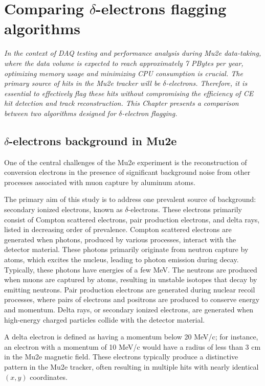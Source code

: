 \chapter{Comparing $\delta$-electrons flagging algorithms}\label{delta}
\textit{In the context of DAQ testing and performance analysis during Mu2e data-taking, 
where the data volume is expected to reach approximately 7 PBytes per year, optimizing 
memory usage and minimizing CPU consumption is crucial. The primary source of hits in the 
Mu2e tracker will be $\delta$-electrons. Therefore, it is essential to effectively flag these 
hits without compromising the efficiency of CE hit detection and track reconstruction. This 
Chapter presents a comparison between two algorithms designed for $\delta$-electron flagging.}
\section{$\delta$-electrons background in Mu2e}
One of the central challenges of the Mu2e experiment is the reconstruction of 
conversion electrons in the presence of significant background noise from 
other processes associated with muon capture by aluminum atoms.

The primary aim of this study is to address one prevalent source of 
background: secondary ionized electrons, known as $\delta$-electrons. 
These electrons primarily consist of Compton scattered electrons, pair production 
electrons, and delta rays, listed in decreasing order of prevalence. Compton 
scattered electrons are generated when photons, produced by various processes, 
interact with the detector material. These photons primarily originate from 
neutron capture by atoms, which excites the nucleus, leading to photon emission 
during decay. Typically, these photons have energies of a few MeV. The neutrons 
are produced when muons are captured by atoms, resulting in unstable isotopes that 
decay by emitting neutrons. Pair production electrons are generated during nuclear 
recoil processes, where pairs of electrons and positrons are produced to conserve 
energy and momentum. Delta rays, or secondary ionized electrons, are generated when 
high-energy charged particles collide with the detector material.

A delta electron is defined as having a momentum below 20 MeV/c; for instance, an 
electron with a momentum of 10 MeV/c would have a radius of less than 3 cm in the 
Mu2e magnetic field. These electrons typically produce a distinctive pattern in the 
Mu2e tracker, often resulting in multiple hits with nearly identical $(x, y)$ coordinates.

